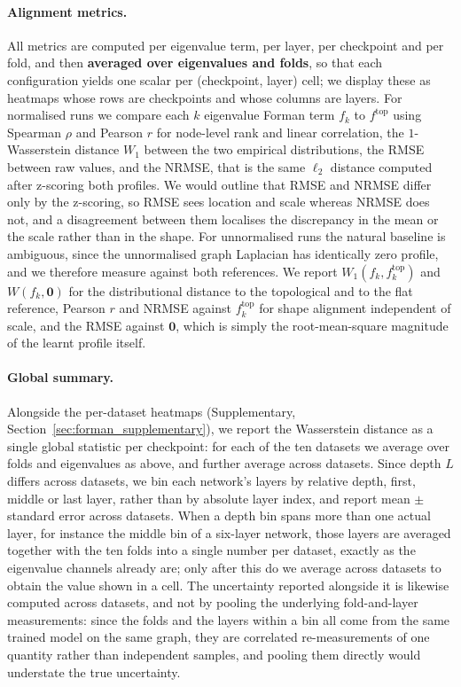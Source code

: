 \paragraph{Alignment metrics.}
All metrics are computed per eigenvalue term, per layer, per checkpoint and per fold,
and then \textbf{averaged over eigenvalues and folds}, so that each configuration yields one
scalar per (checkpoint, layer) cell; we display these as heatmaps whose rows are
checkpoints and whose columns are layers.
For normalised runs we compare each
$k$ eigenvalue Forman term $f_k$ to $f^{\mathrm{top}}$ using Spearman $\rho$ and Pearson $r$ for
node-level rank and linear correlation, the $1$-Wasserstein distance $W_1$
between the two empirical distributions, the RMSE between raw values, and the
NRMSE, that is the same $\ell_2$ distance computed after z-scoring both
profiles.
We would outline that RMSE and NRMSE differ only by
the z-scoring, so RMSE sees location and scale whereas NRMSE does not, and a
disagreement between them localises the discrepancy in the mean or the scale
rather than in the shape.
For unnormalised runs the natural baseline is ambiguous, since the unnormalised
graph Laplacian has identically zero profile, and we therefore measure against
both references. We report $W_1(f_k, f_k^{\mathrm{top}})$ and $W(f_k,\mathbf{0})$
for the distributional distance to the topological and to the flat reference,
Pearson $r$ and NRMSE against $f_k^{\mathrm{top}}$ for shape alignment
independent of scale, and the RMSE against $\mathbf{0}$, which is simply the
root-mean-square magnitude of the learnt profile itself.

\paragraph{Global summary.}
Alongside the per-dataset heatmaps (Supplementary, Section~\ref{sec:forman_supplementary}), we report the Wasserstein distance as a single global statistic per checkpoint: for each of the ten datasets we average over folds and eigenvalues as above, and further average across datasets. Since depth $L$ differs across datasets, we bin each network's layers by relative depth, first, middle or last layer, rather than by absolute layer index, and report mean $\pm$ standard error across datasets.
When a depth bin spans more than one actual layer, for instance the middle bin of a six-layer network, those layers are averaged together with the ten folds into a single number per dataset, exactly as the eigenvalue channels already are; only after this do we average across datasets to obtain the value shown in a cell. The uncertainty reported alongside it is likewise computed across datasets, and not by pooling the underlying fold-and-layer measurements: since the folds and the layers within a bin all come from the same trained model on the same graph, they are correlated re-measurements of one quantity rather than independent samples, and pooling them directly would understate the true uncertainty. 

